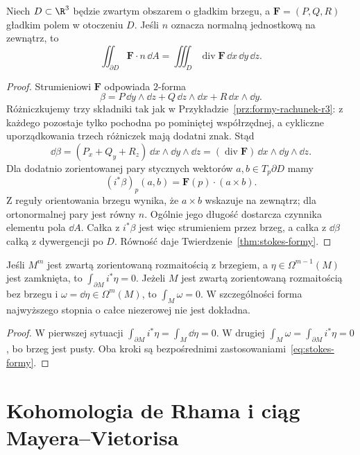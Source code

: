 \begin{wniosek}
\label{cor:stokes-gauss}
Niech $D\subset\R^3$ będzie zwartym obszarem
o gładkim brzegu, a $\mathbf F=(P,Q,R)$
gładkim polem w otoczeniu $D$.
Jeśli $n$ oznacza normalną jednostkową
na zewnątrz, to
\[
 \iint_{\partial D}\mathbf F\cdot n\,\dd A
 =\iiint_D\operatorname{div}\mathbf F\,
                  \dd x\,\dd y\,\dd z.
\]
\end{wniosek}
\begin{proof}
Strumieniowi $\mathbf F$ odpowiada $2$-forma
\[
 \beta=P\,\dd y\wedge\dd z
      +Q\,\dd z\wedge\dd x
      +R\,\dd x\wedge\dd y.
\]
Różniczkujemy trzy składniki tak jak w
Przykładzie~\ref{prz:formy-rachunek-r3}:
z każdego pozostaje tylko pochodna po pominiętej współrzędnej,
a cykliczne uporządkowania trzech różniczek mają dodatni znak.
Stąd
\[
 \dd\beta=(P_x+Q_y+R_z)\,
           \dd x\wedge\dd y\wedge\dd z
          =(\operatorname{div}\mathbf F)\,
           \dd x\wedge\dd y\wedge\dd z.
\]
Dla dodatnio zorientowanej pary stycznych
wektorów $a,b\in T_p\partial D$ mamy
\[
 (i^*\beta)_p(a,b)
 =\mathbf F(p)\cdot(a\times b).
\]
Z reguły orientowania brzegu wynika, że
$a\times b$ wskazuje na zewnątrz; dla
ortonormalnej pary jest równy $n$.
Ogólnie jego długość dostarcza czynnika
elementu pola $\dd A$. Całka z $i^*\beta$
jest więc strumieniem przez brzeg, a całka
z $\dd\beta$ całką z dywergencji po $D$.
Równość daje Twierdzenie~\ref{thm:stokes-formy}.
\end{proof}

\begin{wniosek}
\label{cor:stokes-top-form}
Jeśli $M^m$ jest zwartą zorientowaną rozmaitością
z brzegiem, a $\eta\in\Omega^{m-1}(M)$ jest
zamknięta, to $\int_{\partial M}i^*\eta=0$.
Jeżeli $M$ jest zwartą zorientowaną rozmaitością
bez brzegu i $\omega=\dd\eta\in\Omega^m(M)$,
to $\int_M\omega=0$. W szczególności forma
najwyższego stopnia o całce niezerowej nie jest
dokładna.
\end{wniosek}
\begin{proof}
W pierwszej sytuacji
$\int_{\partial M}i^*\eta=\int_M\dd\eta=0$.
W drugiej
$\int_M\omega=\int_{\partial M}i^*\eta=0$,
bo brzeg jest pusty. Oba kroki są
bezpośrednimi zastosowaniami~\eqref{eq:stokes-formy}.
\end{proof}
\section{Kohomologia de Rhama i ciąg Mayera--Vietorisa}
\label{sec:de-rham-mv}

